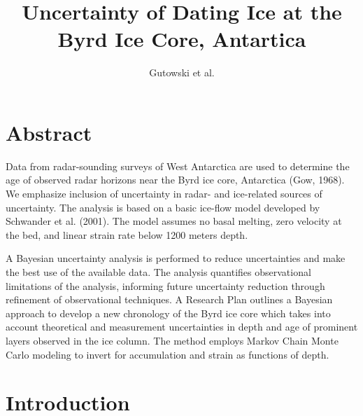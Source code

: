 \documentclass[draft,jgrga]{agutex}
\begin{document}
\title{Uncertainty of Dating Ice at the Byrd Ice Core, Antartica}
\author{Gutowski et al.}

\section{Abstract}
Data from radar-sounding surveys of West Antarctica are used to determine the age of observed radar horizons near the Byrd ice core, Antarctica (Gow, 1968). We emphasize inclusion of uncertainty in radar- and ice-related sources of uncertainty. The analysis is based on a basic ice-flow model developed by Schwander et al. (2001). The model assumes no basal melting, zero velocity at the bed, and linear strain rate below 1200 meters depth.

A Bayesian uncertainty analysis is performed to reduce uncertainties and make the best use of the available data. The analysis quantifies observational limitations of the analysis, informing future uncertainty reduction through refinement of observational techniques. A Research Plan outlines a Bayesian approach to develop a new chronology of the Byrd ice core which takes into account theoretical and measurement uncertainties in depth and age of prominent layers observed in the ice column. The method employs Markov Chain Monte Carlo modeling to invert for accumulation and strain as functions of depth. 


\section{Introduction}
\end{document}
